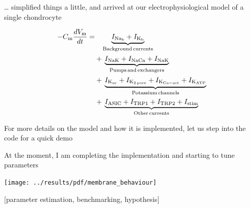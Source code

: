 \documentclass[ignorenonframetext]{beamer}
\newcommand{\references}[1] {
  \begin{flushright}
    \scriptsize [#1] \normalsize
  \end{flushright}
}
\begin{document}
\begin{frame}{\ldots{} simplified things a little, and arrived at our
    electrophysiological model of a single chondrocyte}

  \begin{equation*}
    \begin{split}
      -C_{\rm m} \frac{dV_{\rm m}}{dt} = & \phantom{+\,} \underbrace{I_{\rm Na_b} + I_{\rm K_b}}_{\rm Background\, currents}\\
      & +\, \underbrace{I_{\rm NaK} + I_{\rm NaCa} + I_{\rm NaK}}_{\rm Pumps\, and\, exchangers}\\
      & +\, \underbrace{I_{\rm K_{ur}} + I_{\rm K_{2\, pore}} + I_{\rm K_{Ca-act}} + I_{\rm K_{ATP}}}_{\rm Potassium\, channels}\\
      & +\, \underbrace{I_{\rm ASIC} + I_{\rm TRP1} + I_{\rm TRP2} + I_{\rm stim}}_{\rm Other\, currents}
    \end{split}
  \end{equation*}

  \vspace{0.5cm}
  \pause
  For more details on the model and how it is implemented, let us step
  into the code for a quick demo

\end{frame}



%

\begin{frame}{At the moment, I am completing the implementation and
    starting to tune parameters}

  \vspace{-0.4cm}

  \begin{center}
    \texttt{[image: ../results/pdf/membrane\_behaviour]}
  \end{center}

  \references{parameter estimation, benchmarking, hypothesis}

\end{frame}

\end{document}
